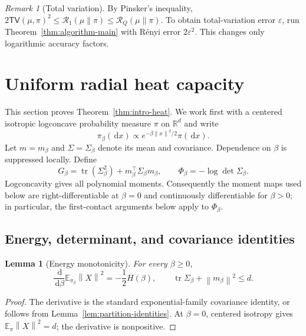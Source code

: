 \documentclass[11pt]{article}
\newtheorem{lemma}[theorem]{Lemma}
\theoremstyle{remark}
\newtheorem{remark}[theorem]{Remark}
\newcommand{\R}{\mathbb R}
\newcommand{\E}{\mathbb E}
\newcommand{\1}{\bm 1}
\newcommand{\eps}{\varepsilon}
\newcommand{\TV}{\mathsf{TV}}
\newcommand{\tr}{\operatorname{tr}}
\newcommand{\dd}{\,\mathrm d}
\newcommand{\norm}[1]{\left\lVert #1\right\rVert}
\begin{document}
\begin{remark}[Total variation]
By Pinsker's inequality,
$2\TV(\mu,\pi)^2\leq\mathcal R_1(\mu\|\pi)\leq\mathcal R_Q(\mu\|\pi)$.
To obtain total-variation error $\eps$, run
Theorem~\ref{thm:algorithm-main} with R\'enyi error $2\eps^2$.  This
changes only logarithmic accuracy factors.
\end{remark}

\section{Uniform radial heat capacity}
\label{sec:heat}

This section proves Theorem~\ref{thm:intro-heat}.  We work first with a
centered isotropic logconcave probability measure $\pi$ on $\R^d$ and
write
\[
  \pi_\beta(\dd x)\propto e^{-\beta\norm x^2/2}\pi(\dd x).
\]
Let $m=m_\beta$ and $\Sigma=\Sigma_\beta$ denote its mean and
covariance.  Dependence on $\beta$ is suppressed locally.  Define
\begin{equation}\label{eq:G-Phi}
  G_\beta=\tr(\Sigma_\beta^2)
     +m_\beta^\top\Sigma_\beta m_\beta,
  \qquad
  \Phi_\beta=-\log\det\Sigma_\beta.
\end{equation}
Logconcavity gives all polynomial moments.  Consequently the moment
maps used below are right-differentiable at $\beta=0$ and continuously
differentiable for $\beta>0$; in particular, the first-contact arguments
below apply to $\Phi_\beta$.

\subsection{Energy, determinant, and covariance identities}

\begin{lemma}[Energy monotonicity]
\label{lem:energy}
For every $\beta\geq0$,
\begin{equation}\label{eq:energy-monotonicity}
  \frac{\dd}{\dd\beta}\E_{\pi_\beta}\norm X^2
  =-\frac12H(\beta),
  \qquad
  \tr\Sigma_\beta+\norm{m_\beta}^2\leq d.
\end{equation}
\end{lemma}

\begin{proof}
The derivative is the standard exponential-family covariance identity,
or follows from Lemma~\ref{lem:partition-identities}.  At $\beta=0$,
centered isotropy gives $\E_\pi\norm X^2=d$; the derivative is
nonpositive.
\end{proof}
\end{document}
